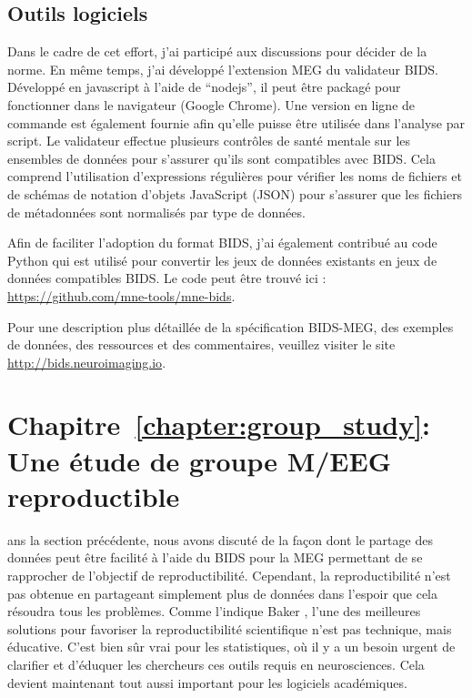 \subsection*{Outils logiciels}
Dans le cadre de cet effort, j'ai participé aux discussions pour décider de la norme. En même temps, j'ai développé l'extension MEG du validateur BIDS. Développé en javascript à l'aide de “nodejs”, il peut être packagé pour fonctionner dans le navigateur (Google Chrome). Une version en ligne de commande est également fournie afin qu'elle puisse être utilisée dans l'analyse par script. Le validateur effectue plusieurs contrôles de santé mentale sur les ensembles de données pour s'assurer qu'ils sont compatibles avec BIDS. Cela comprend l'utilisation d'expressions régulières pour vérifier les noms de fichiers et de schémas de notation d'objets JavaScript (JSON) pour s'assurer que les fichiers de métadonnées sont normalisés par type de données.

Afin de faciliter l'adoption du format BIDS, j'ai également contribué au code Python qui est utilisé pour convertir les jeux de données existants en jeux de données compatibles BIDS. Le code peut être trouvé ici : \url{https://github.com/mne-tools/mne-bids}. 

Pour une description plus détaillée de la spécification BIDS-MEG, des exemples de données, des ressources et des commentaires, veuillez visiter le site \url{http://bids.neuroimaging.io}.

\section*{Chapitre~\ref{chapter:group_study}: Une étude de groupe M/EEG reproductible}

ans la section précédente, nous avons discuté de la façon dont le partage des données peut être facilité à l'aide du BIDS pour la MEG permettant de se rapprocher de l'objectif de reproductibilité. Cependant, la reproductibilité n'est pas obtenue en partageant simplement plus de données dans l'espoir que cela résoudra tous les problèmes. Comme l'indique Baker \citet{baker20161}, l'une des meilleures solutions pour favoriser la reproductibilité scientifique n'est pas technique, mais éducative. C'est bien sûr vrai pour les statistiques, où il y a un besoin urgent de clarifier et d'éduquer les chercheurs ces outils requis en neurosciences. Cela devient maintenant tout aussi important pour les logiciels académiques.

